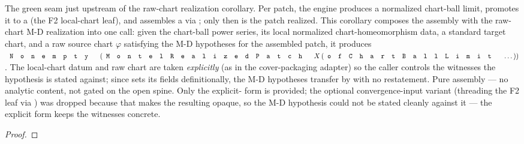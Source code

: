 \begin{lemma}
\label{lem:montel-realized-patch-ofChartBallLimit}
The green seam just upstream of the raw-chart realization corollary. Per patch,
the engine produces a normalized chart-ball limit, promotes it to a
 (the F2 local-chart leaf), and assembles
a  via
; only then is the patch
realized. This corollary composes the  assembly with the
raw-chart M-D realization into one call: given the chart-ball power series, its
local normalized chart-homeomorphism data, a standard target chart, and a raw
source chart \(\varphi\) satisfying the M-D hypotheses for the assembled patch, it
produces \(\code{Nonempty}\,(\code{MontelRealizedPatch}\,X\,(\code{ofChartBallLimit}\,\dots))\).
The local-chart datum and raw chart are taken \emph{explicitly} (as in the
cover-packaging adapter) so the caller controls the witnesses the
 hypothesis is stated against; since 
sets its fields definitionally, the M-D hypotheses transfer by  with no
restatement. Pure assembly --- no analytic content, not gated on the open spine.
Only the explicit- form is provided; the optional
convergence-input variant (threading the F2 leaf
via ) was dropped because that  makes the resulting
 opaque, so the M-D  hypothesis could not be
stated cleanly against it --- the explicit form keeps the witnesses concrete.
\leanok
\end{lemma}
\begin{proof}\leanok\end{proof}

